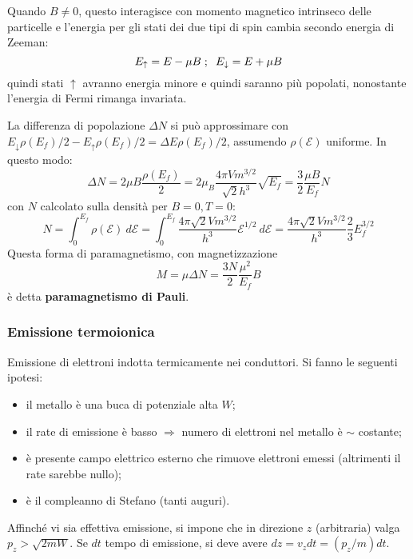 \documentclass[10pt, a4paper]{scrartcl}
\numberwithin{equation}{subsection}
\theoremstyle{style1}
\begin{document}
Quando $B \neq 0 $, questo interagisce con momento magnetico intrinseco delle particelle e l'energia per gli stati dei due tipi di spin cambia secondo energia di Zeeman:
\[
	E_\uparrow = E - \mu  B \hspace{.1cm} ; \hspace{.2cm} E _\downarrow = E + \mu B
\] 
quindi stati $\uparrow$ avranno energia minore e quindi saranno pi\`u popolati, nonostante l'energia di Fermi rimanga invariata.

La differenza di popolazione $\Delta N$ si pu\`o approssimare con $ E_\downarrow\rho (E_f) / 2 - E_\uparrow\rho (E_f) / 2  = \Delta E \rho (E_f) / 2$, assumendo $\rho (\mathscr{E})$ uniforme.
In questo modo:
\[
\Delta N = 2\mu B \frac{\rho (E_f) }{2} = 2\mu  _B \frac{4 \pi V m^{3 / 2} }{\sqrt{2} h^3}\sqrt{E_f} = \frac{3}{2} \frac{\mu  B }{E_f}N
\] 
con $N$ calcolato sulla densit\`a per $B=0 , T=0$:
\[
N = \int_{0} ^{E_f} \rho  (\mathscr{E}) \ d \mathscr{E} = \int_{0} ^{E_f} \frac{4\pi \sqrt{2} V m^{3 / 2} }{h^3} \mathscr{E}^{1 / 2}  \ d \mathscr{E} = \frac{4\pi \sqrt{2} V m^{3/2} }{h^3} \frac{2}{3} E_f^{ 3 / 2} 
\] 
Questa forma di paramagnetismo, con magnetizzazione
\begin{equation}
	M = \mu  \Delta N = \frac{3N}{2} \frac{\mu ^2}{E_f}B
\end{equation}
\`e detta \textbf{paramagnetismo di Pauli}.

\subsubsection{Emissione termoionica}

Emissione di elettroni indotta termicamente nei conduttori. Si fanno le seguenti ipotesi:
\begin{itemize}
	\item il metallo \`e una buca di potenziale alta $W$;
	\item il rate di emissione \`e basso $\Rightarrow $ numero di elettroni nel metallo \`e $\sim$ costante;
	\item \`e presente campo elettrico esterno che rimuove elettroni emessi (altrimenti il rate sarebbe nullo);
	\item \`e il compleanno di Stefano (tanti auguri).
\end{itemize}
Affinch\'e vi sia effettiva emissione, si impone che in direzione $z$ (arbitraria) valga $p_z > \sqrt{2m W} $. 
Se $dt$ tempo di emissione, si deve avere $dz = v_z dt = (p_z / m) dt$.
\end{document}
